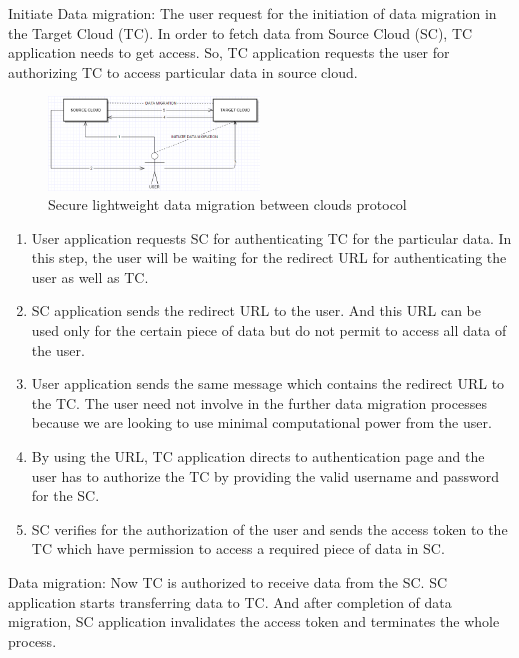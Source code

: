 \documentclass[11pt, pdftex, conference]{IEEEtran}
\begin{document}
Initiate Data migration: The user request for the initiation of data migration in the Target Cloud (TC). In order to fetch data from Source Cloud (SC), TC application needs to get access. So, TC application requests the user for authorizing TC to access particular data in source cloud.
\linebreak
\begin{figure}
\includegraphics[width=0.5\textwidth]{CLOUD}
\caption{Secure lightweight data migration between clouds protocol}
\end{figure}
\begin{enumerate}
\item User application requests SC for authenticating TC for the particular data. In this step, the user will be waiting for the redirect URL for authenticating the user as well as TC.
\item SC application sends the redirect URL to the user. And this URL can be used only for the certain piece of data but do not permit to access all data of the user.
\item User application sends the same message which contains the redirect URL to the TC. The user need not involve in the further data migration processes because we are looking to use minimal computational power from the user.
\item By using the URL, TC application directs to authentication page and the user has to authorize the TC by providing the valid username and password for the SC.
\item SC verifies for the authorization of the user and sends the access token to the TC which have permission to access a required piece of data in SC.
\end{enumerate}
Data migration: Now TC is authorized to receive data from the SC. SC application starts transferring data to TC. And after completion of data migration, SC application invalidates the access token and terminates the whole process. \linebreak
\end{document}
